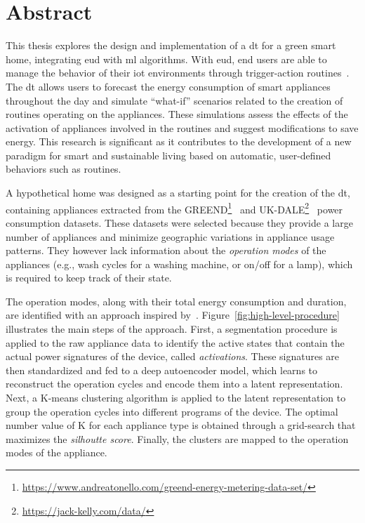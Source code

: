 \section*{Abstract}

This thesis explores the design and implementation of a \acrfull*{dt} for a green smart home, integrating \acrlong*{eud} with \acrlong*{ml} algorithms. With \acrlong*{eud}, end users are able to manage the behavior of their \acrlong*{iot} environments through trigger-action routines~\parencite{barricelliEnduserDevelopmentEnduser2019}. The \acrshort*{dt} allows users to forecast the energy consumption of smart appliances throughout the day and simulate ``what-if'' scenarios related to the creation of routines operating on the appliances. These simulations assess the effects of the activation of appliances involved in the routines and suggest modifications to save energy. This research is significant as it contributes to the development of a new paradigm for smart and sustainable living based on automatic, user-defined behaviors such as routines.

A hypothetical home was designed as a starting point for the creation of the \acrshort*{dt}, containing appliances extracted from the GREEND\footnote{\url{https://www.andreatonello.com/greend-energy-metering-data-set/}}~\parencite{monacchiGREENDEnergyConsumption2014} and UK-DALE\footnote{\url{https://jack-kelly.com/data/}}~\parencite{kellyUKDALEDatasetDomestic2015} power consumption datasets. These datasets were selected because they provide a large number of appliances and minimize geographic variations in appliance usage patterns. They however lack information about the \textit{operation modes} of the appliances (e.g., wash cycles for a washing machine, or on/off for a lamp), which is required to keep track of their state.

The operation modes, along with their total energy consumption and duration, are identified with an approach inspired by~\cite{castangiaClusteringApplianceOperation2023}. Figure~\ref{fig:high-level-procedure} illustrates the main steps of the approach. First, a segmentation procedure is applied to the raw appliance data to identify the active states that contain the actual power signatures of the device, called \textit{activations}. These signatures are then standardized and fed to a deep autoencoder model, which learns to reconstruct the operation cycles and encode them into a latent representation. Next, a K-means clustering algorithm is applied to the latent representation to group the operation cycles into different programs of the device. The optimal number value of K for each appliance type is obtained through a grid-search that maximizes the \textit{silhoutte score}. Finally, the clusters are mapped to the operation modes of the appliance.

